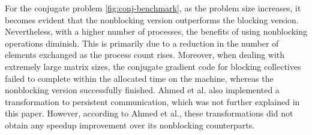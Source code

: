 For the conjugate problem \autoref{fig:conj-benchmark}, as the problem size increases, it becomes evident that the nonblocking version outperforms the blocking version. 
Nevertheless, with a higher number of processes, the benefits of using nonblocking operations diminish. 
This is primarily due to a reduction in the number of elements exchanged as the process count rises. 
Moreover, when dealing with extremely large matrix sizes, the conjugate gradient code for blocking collectives failed to complete within the allocated time on the machine, whereas the nonblocking version successfully finished. 
Ahmed et al. also implemented a transformation to persistent communication, which was not further explained in this paper. However, according to Ahmed et al., these transformations did not obtain any speedup improvement over its nonblocking counterparts.



